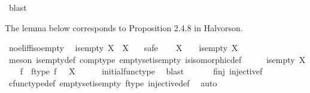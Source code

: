 \begin{isabellebody}
\ blast%
\endisatagproof
{\isafoldproof}%
%
\isadelimproof
%
\endisadelimproof
%
\begin{isamarkuptext}%
The lemma below corresponds to Proposition 2.4.8 in Halvorson.%
\end{isamarkuptext}\isamarkuptrue%
\isamarkupfalse%
\ no{\isacharunderscore}{\kern0pt}el{\isacharunderscore}{\kern0pt}iff{\isacharunderscore}{\kern0pt}iso{\isacharunderscore}{\kern0pt}empty{\isacharcolon}{\kern0pt}\isanewline
\ \ {\isachardoublequoteopen}is{\isacharunderscore}{\kern0pt}empty\ X\ {\isasymlongleftrightarrow}\ X\ {\isasymcong}\ {\isasymemptyset}{\isachardoublequoteclose}\isanewline
%
\isadelimproof
%
\endisadelimproof
%
\isatagproof
{}\isamarkupfalse%
\ safe\isanewline
\ \ \isamarkupfalse%
\ {\isachardoublequoteopen}X\ {\isasymcong}\ {\isasymemptyset}\ {\isasymLongrightarrow}\ is{\isacharunderscore}{\kern0pt}empty\ X{\isachardoublequoteclose}\isanewline
\ \ \ \ \isamarkupfalse%
\ {\isacharparenleft}{\kern0pt}meson\ is{\isacharunderscore}{\kern0pt}empty{\isacharunderscore}{\kern0pt}def\ comp{\isacharunderscore}{\kern0pt}type\ emptyset{\isacharunderscore}{\kern0pt}is{\isacharunderscore}{\kern0pt}empty\ is{\isacharunderscore}{\kern0pt}isomorphic{\isacharunderscore}{\kern0pt}def{\isacharparenright}{\kern0pt}\isanewline
{}\isamarkupfalse%
\ \isanewline
\ \ \isamarkupfalse%
\ {\isachardoublequoteopen}is{\isacharunderscore}{\kern0pt}empty\ X{\isachardoublequoteclose}\isanewline
\ \ \isamarkupfalse%
\ f\ \ f{\isacharunderscore}{\kern0pt}type{\isacharcolon}{\kern0pt}\ {\isachardoublequoteopen}f{\isacharcolon}{\kern0pt}\ {\isasymemptyset}\ {\isasymrightarrow}\ X{\isachardoublequoteclose}\isanewline
\ \ \ \ \isamarkupfalse%
\ initial{\isacharunderscore}{\kern0pt}func{\isacharunderscore}{\kern0pt}type\ \isamarkupfalse%
\ blast\isanewline
\ \isanewline
\ \ \isamarkupfalse%
\ \ f{\isacharunderscore}{\kern0pt}inj{\isacharcolon}{\kern0pt}\ {\isachardoublequoteopen}injective{\isacharparenleft}{\kern0pt}f{\isacharparenright}{\kern0pt}{\isachardoublequoteclose}\isanewline
\ \ \ \ \isamarkupfalse%
\ cfunc{\isacharunderscore}{\kern0pt}type{\isacharunderscore}{\kern0pt}def\ emptyset{\isacharunderscore}{\kern0pt}is{\isacharunderscore}{\kern0pt}empty\ f{\isacharunderscore}{\kern0pt}type\ injective{\isacharunderscore}{\kern0pt}def\ \isamarkupfalse%
\ auto\isanewline
\ \ \isamarkupfalse%
\ \isamarkupfalse%

\end{isabellebody}
